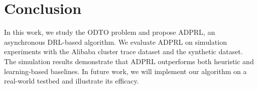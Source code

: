 \documentclass[10pt, conference, letterpaper]{IEEEtran}
\begin{document}
\section{Conclusion}\label{sec:conclusion}
In this work, we study the ODTO problem and propose ADPRL, an asynchronous DRL-based algorithm. We evaluate ADPRL on simulation experiments with the Alibaba cluster trace dataset and the synthetic dataset. The simulation results demonstrate that ADPRL outperforms both heuristic and learning-based baselines. In future work, we will implement our algorithm on a real-world testbed and illustrate its efficacy.




\end{document}
